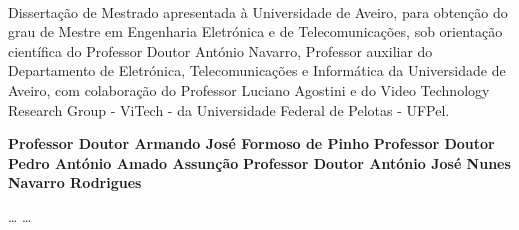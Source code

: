 \TitlePage

  \HEADER{\BAR}
         {\ThesisYear}
  \TITLE{\myName}
        {\TituloTese}
        {\ThesisTitle}
\EndTitlePage
\titlepage\ \endtitlepage %


%
%

\TitlePage
  \HEADER{}{\ThesisYear}
  \TITLE{\myName}
        {\TituloTese}
        {\ThesisTitle}
  \vskip 15mm
  \TEXT{}
       {Dissertação de Mestrado apresentada à Universidade de Aveiro, para obtenção do grau de Mestre em Engenharia Eletrónica e de Telecomunicações, sob orientação científica do Professor Doutor António Navarro, Professor auxiliar do Departamento de Eletrónica, Telecomunicações e Informática da  Universidade de Aveiro, com colaboração do Professor Luciano Agostini e do Video Technology Research Group - ViTech - da Universidade Federal de Pelotas - UFPel.}
\EndTitlePage
\titlepage\ \endtitlepage %

\TitlePage
  \vspace*{55mm}
       {}
       {\textbf{ Professor Doutor Armando José Formoso de Pinho
       }}
  \vspace*{5mm}
       {\textbf{Professor Doutor Pedro António Amado Assunção}}
  \vspace*{5mm}
  \TEXT{}
       {\textbf{Professor Doutor António José Nunes Navarro Rodrigues}}
\EndTitlePage
\titlepage\ \endtitlepage %

\TitlePage
  \vspace*{55mm}
       {\ldots}
  \TEXT{}
       {\ldots}
\EndTitlePage
\titlepage\ \endtitlepage %


